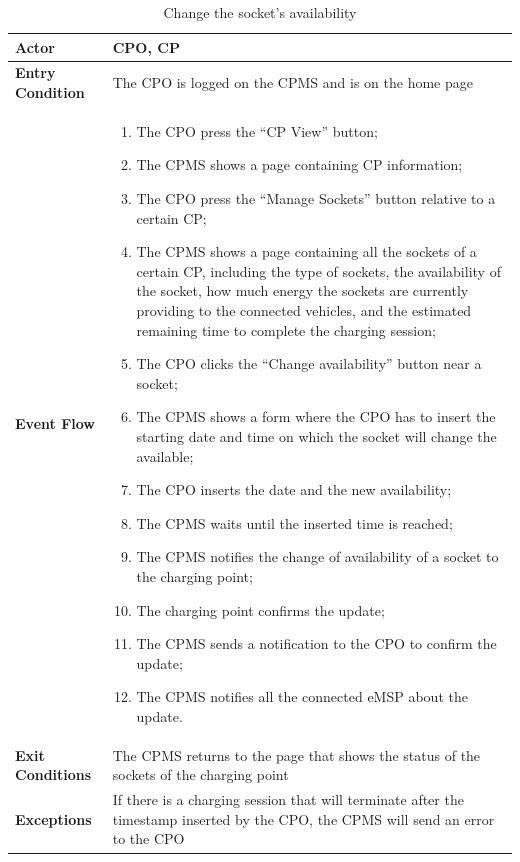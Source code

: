 \documentclass{Configuration_Files/PoliMi3i_thesis}
\begin{document}
\begin{table}[H]
    \begin{tabularx}{\textwidth}{| >{\columncolor{bluepoli!40}}l | X |}
    \hline
    \textbf{Actor} & CPO, CP\T\B \\
    \hline
    \textbf{Entry Condition} & The CPO is logged on the CPMS and is on the home page\T\B\\
    \hline
    \textbf{Event Flow} & 
        \begin{enumerate}
        \item The CPO press the “CP View” button;
        \item The CPMS shows a page containing CP information;
        \item The CPO press the “Manage Sockets” button relative to a certain CP;
        \item The CPMS shows a page containing all the sockets of a certain CP, including the type of sockets, the availability of the socket, how much energy the sockets are currently providing to the connected vehicles, and the estimated remaining time to complete the charging session;
        \item The CPO clicks the “Change availability” button near a socket;
        \item The CPMS shows a form where the CPO has to insert the starting date and time on which the socket will change the available;
        \item The CPO inserts the date and the new availability;
        \item The CPMS waits until the inserted time is reached;
        \item The CPMS notifies the change of availability of a socket to the charging point;
        \item The charging point confirms the update;
        \item The CPMS sends a notification to the CPO to confirm the update;
        \item The CPMS notifies all the connected eMSP about the update.
        \end{enumerate}\B\\
    \hline
    \textbf{Exit Conditions} & The CPMS returns to the page that shows the status of the sockets of the charging point\B\\
    \hline
    \textbf{Exceptions} & If there is a charging session that will terminate after the timestamp inserted by the CPO, the CPMS will send an error to the CPO\B\\
    \hline
    \end{tabularx}
    \\[10pt]
    \caption{Change the socket’s  availability}
    \label{table:example}
\end{table}
\end{document}
